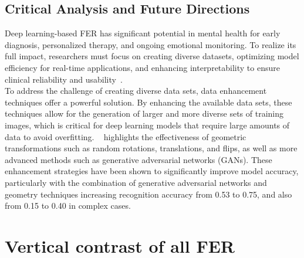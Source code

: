 \documentclass[lettersize,journal]{IEEEtran}
\begin{document}
\subsection*{Critical Analysis and Future Directions}

Deep learning-based FER has significant potential in mental health for early diagnosis, personalized therapy, and ongoing emotional monitoring. To realize its full impact, researchers must focus on creating diverse datasets, optimizing model efficiency for real-time applications, and enhancing interpretability to ensure clinical reliability and usability~\cite{Dada2023, Vignesh2023}.\\


To address the challenge of creating diverse data sets, data enhancement techniques offer a powerful solution. By enhancing the available data sets, these techniques allow for the generation of larger and more diverse sets of training images, which is critical for deep learning models that require large amounts of data to avoid overfitting. ~\cite{Akhand2021} highlights the effectiveness of geometric transformations such as random rotations, translations, and flips, as well as more advanced methods such as generative adversarial networks (GANs). These enhancement strategies have been shown to significantly improve model accuracy, particularly with the combination of generative adversarial networks and geometry techniques increasing recognition accuracy from 0.53 to 0.75, and also from 0.15 to 0.40 in complex cases.




\section{Vertical contrast of all FER}
\end{document}
